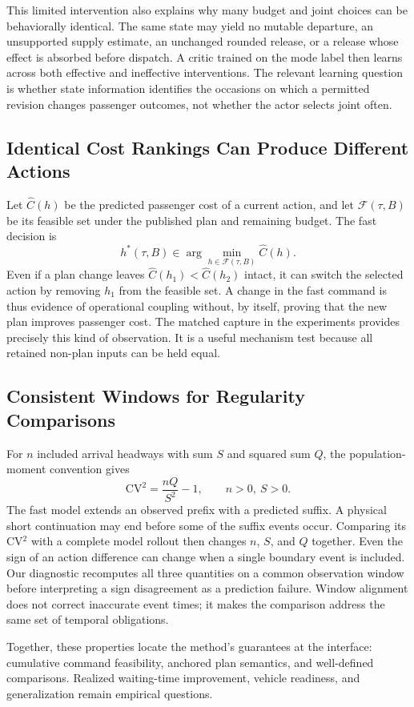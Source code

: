 This limited intervention also explains why many budget and joint choices can be behaviorally identical. The same state may yield no mutable departure, an unsupported supply estimate, an unchanged rounded release, or a release whose effect is absorbed before dispatch. A critic trained on the mode label then learns across both effective and ineffective interventions. The relevant learning question is whether state information identifies the occasions on which a permitted revision changes passenger outcomes, not whether the actor selects joint often.

\subsection{Identical Cost Rankings Can Produce Different Actions}
Let $\widehat C(h)$ be the predicted passenger cost of a current action, and let $\mathcal F(\tau,B)$ be its feasible set under the published plan and remaining budget. The fast decision is
\begin{equation}
 h^*(\tau,B)\in\arg\min_{h\in\mathcal F(\tau,B)}\widehat C(h).
\end{equation}
Even if a plan change leaves $\widehat C(h_1)<\widehat C(h_2)$ intact, it can switch the selected action by removing $h_1$ from the feasible set. A change in the fast command is thus evidence of operational coupling without, by itself, proving that the new plan improves passenger cost. The matched capture in the experiments provides precisely this kind of observation. It is a useful mechanism test because all retained non-plan inputs can be held equal.

\subsection{Consistent Windows for Regularity Comparisons}
For $n$ included arrival headways with sum $S$ and squared sum $Q$, the population-moment convention gives
\begin{equation}
 \mathrm{CV}^2=\frac{nQ}{S^2}-1,\qquad n>0,\ S>0.
 \label{eq:cv_moments}
\end{equation}
The fast model extends an observed prefix with a predicted suffix. A physical short continuation may end before some of the suffix events occur. Comparing its CV$^2$ with a complete model rollout then changes $n$, $S$, and $Q$ together. Even the sign of an action difference can change when a single boundary event is included. Our diagnostic recomputes all three quantities on a common observation window before interpreting a sign disagreement as a prediction failure. Window alignment does not correct inaccurate event times; it makes the comparison address the same set of temporal obligations.

Together, these properties locate the method's guarantees at the interface: cumulative command feasibility, anchored plan semantics, and well-defined comparisons. Realized waiting-time improvement, vehicle readiness, and generalization remain empirical questions.
